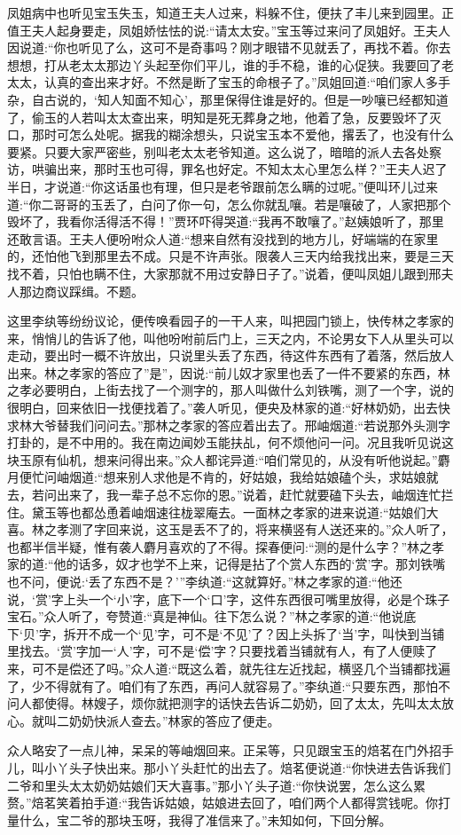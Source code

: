 \begin{parag}
    凤姐病中也听见宝玉失玉，知道王夫人过来，料躲不住，便扶了丰儿来到园里。正值王夫人起身要走，凤姐娇怯怯的说:“请太太安。”宝玉等过来问了凤姐好。王夫人因说道:“你也听见了么，这可不是奇事吗？刚才眼错不见就丢了，再找不着。你去想想，打从老太太那边丫头起至你们平儿，谁的手不稳，谁的心促狭。我要回了老太太，认真的查出来才好。不然是断了宝玉的命根子了。”凤姐回道:“咱们家人多手杂，自古说的，‘知人知面不知心’，那里保得住谁是好的。但是一吵嚷已经都知道了，偷玉的人若叫太太查出来，明知是死无葬身之地，他着了急，反要毁坏了灭口，那时可怎么处呢。据我的糊涂想头，只说宝玉本不爱他，撂丢了，也没有什么要紧。只要大家严密些，别叫老太太老爷知道。这么说了，暗暗的派人去各处察访，哄骗出来，那时玉也可得，罪名也好定。不知太太心里怎么样？”王夫人迟了半日，才说道:“你这话虽也有理，但只是老爷跟前怎么瞒的过呢。”便叫环儿过来道:“你二哥哥的玉丢了，白问了你一句，怎么你就乱嚷。若是嚷破了，人家把那个毁坏了，我看你活得活不得！”贾环吓得哭道:“我再不敢嚷了。”赵姨娘听了，那里还敢言语。王夫人便吩咐众人道:“想来自然有没找到的地方儿，好端端的在家里的，还怕他飞到那里去不成。只是不许声张。限袭人三天内给我找出来，要是三天找不着，只怕也瞒不住，大家那就不用过安静日子了。”说着，便叫凤姐儿跟到邢夫人那边商议踩缉。不题。
\end{parag}


\begin{parag}
    这里李纨等纷纷议论，便传唤看园子的一干人来，叫把园门锁上，快传林之孝家的来，悄悄儿的告诉了他，叫他吩咐前后门上，三天之内，不论男女下人从里头可以走动，要出时一概不许放出，只说里头丢了东西，待这件东西有了着落，然后放人出来。林之孝家的答应了”是”，因说:“前儿奴才家里也丢了一件不要紧的东西，林之孝必要明白，上街去找了一个测字的，那人叫做什么刘铁嘴，测了一个字，说的很明白，回来依旧一找便找着了。”袭人听见，便央及林家的道:“好林奶奶，出去快求林大爷替我们问问去。”那林之孝家的答应着出去了。邢岫烟道:“若说那外头测字打卦的，是不中用的。我在南边闻妙玉能扶乩，何不烦他问一问。况且我听见说这块玉原有仙机，想来问得出来。”众人都诧异道:“咱们常见的，从没有听他说起。”麝月便忙问岫烟道:“想来别人求他是不肯的，好姑娘，我给姑娘磕个头，求姑娘就去，若问出来了，我一辈子总不忘你的恩。”说着，赶忙就要磕下头去，岫烟连忙拦住。黛玉等也都怂恿着岫烟速往栊翠庵去。一面林之孝家的进来说道:“姑娘们大喜。林之孝测了字回来说，这玉是丢不了的，将来横竖有人送还来的。”众人听了，也都半信半疑，惟有袭人麝月喜欢的了不得。探春便问:“测的是什么字？”林之孝家的道:“他的话多，奴才也学不上来，记得是拈了个赏人东西的‘赏’字。那刘铁嘴也不问，便说:‘丢了东西不是？’”李纨道:“这就算好。”林之孝家的道:“他还说，‘赏’字上头一个‘小’字，底下一个‘口’字，这件东西很可嘴里放得，必是个珠子宝石。”众人听了，夸赞道:“真是神仙。往下怎么说？”林之孝家的道:“他说底下‘贝’字，拆开不成一个‘见’字，可不是‘不见’了？因上头拆了‘当’字，叫快到当铺里找去。‘赏’字加一‘人’字，可不是‘偿’字？只要找着当铺就有人，有了人便赎了来，可不是偿还了吗。”众人道:“既这么着，就先往左近找起，横竖几个当铺都找遍了，少不得就有了。咱们有了东西，再问人就容易了。”李纨道:“只要东西，那怕不问人都使得。林嫂子，烦你就把测字的话快去告诉二奶奶，回了太太，先叫太太放心。就叫二奶奶快派人查去。”林家的答应了便走。
\end{parag}


\begin{parag}
    众人略安了一点儿神，呆呆的等岫烟回来。正呆等，只见跟宝玉的焙茗在门外招手儿，叫小丫头子快出来。那小丫头赶忙的出去了。焙茗便说道:“你快进去告诉我们二爷和里头太太奶奶姑娘们天大喜事。”那小丫头子道:“你快说罢，怎么这么累赘。”焙茗笑着拍手道:“我告诉姑娘，姑娘进去回了，咱们两个人都得赏钱呢。你打量什么，宝二爷的那块玉呀，我得了准信来了。”未知如何，下回分解。
\end{parag}